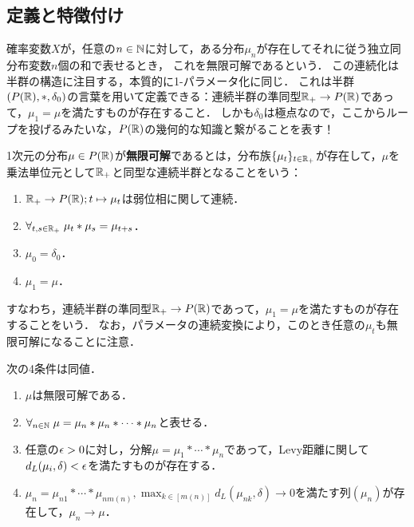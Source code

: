 \documentclass[uplatex,dvipdfmx]{jsreport}
\begin{document}
\subsection{定義と特徴付け}

\begin{tcolorbox}[colframe=ForestGreen, colback=ForestGreen!10!white,breakable,colbacktitle=ForestGreen!40!white,coltitle=black,fonttitle=\bfseries\sffamily,
title=]
    確率変数$X$が，任意の$n\in\mathbb{N}$に対して，ある分布$\mu_n$が存在してそれに従う独立同分布変数$n$個の和で表せるとき，
    これを無限可解であるという．
    この連続化は半群の構造に注目する，本質的に1-パラメータ化に同じ．
    これは半群$(P(\mathbb{R}),*,\delta_0)$の言葉を用いて定義できる：連続半群の準同型$\mathbb{R}_+\to P(\mathbb{R})$であって，$\mu_1=\mu$を満たすものが存在すること．
    しかも$\delta_0$は極点なので，ここからループを投げるみたいな，$P(\mathbb{R})$の幾何的な知識と繋がることを表す！
\end{tcolorbox}

\begin{definition}
    1次元の分布$\mu\in P(\mathbb{R})$が\textbf{無限可解}であるとは，分布族$\{\mu_t\}_{t\in\mathbb{R}_+}$が存在して，$\mu$を乗法単位元として$\mathbb{R}_+$と同型な連続半群となることをいう：
    \begin{enumerate}
        \item $\mathbb{R}_+\to P(\mathbb{R});t\mapsto\mu_t$は弱位相に関して連続．
        \item $\forall_{t,s\in\mathbb{R}_+}\;\mu_t*\mu_s=\mu_{t+s}$．
        \item $\mu_0=\delta_0$．
        \item $\mu_1=\mu$．
    \end{enumerate}
    すなわち，連続半群の準同型$\mathbb{R}_+\to P(\mathbb{R})$であって，$\mu_1=\mu$を満たすものが存在することをいう．
    なお，パラメータの連続変換により，このとき任意の$\mu_t$も無限可解になることに注意．
\end{definition}

\begin{lemma}[無限可解性の特徴付け]
    次の4条件は同値．
    \begin{enumerate}
        \item $\mu$は無限可解である．
        \item $\forall_{n\in\mathbb{N}}\;\mu=\mu_n*\mu_n*\cdots *\mu_n$と表せる．
        \item 任意の$\epsilon>0$に対し，分解$\mu=\mu_1*\cdots*\mu_n$であって，Levy距離に関して$d_L(\mu_i,\delta)<\epsilon$を満たすものが存在する．
        \item $\mu_n=\mu_{n1}*\cdots*\mu_{nm(n)},\max_{k\in[m(n)]}d_L(\mu_{nk},\delta)\to0$を満たす列$(\mu_n)$が存在して，$\mu_n\to\mu$．
    \end{enumerate}
\end{lemma}
\end{document}
